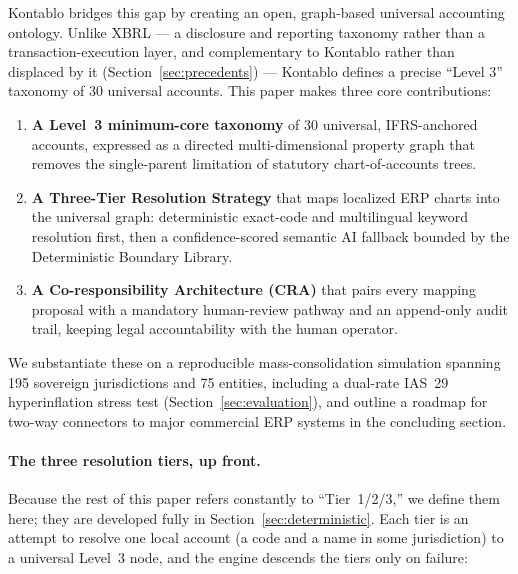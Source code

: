 Kontablo bridges this gap by creating an open, graph-based universal accounting ontology. Unlike XBRL --- a disclosure and reporting taxonomy rather than a transaction-execution layer, and complementary to Kontablo rather than displaced by it (Section~\ref{sec:precedents}) --- Kontablo defines a precise ``Level 3'' taxonomy of 30 universal accounts. This paper makes three core contributions:
\begin{enumerate}
    \item \textbf{A Level~3 minimum-core taxonomy} of 30 universal, IFRS-anchored accounts, expressed as a directed multi-dimensional property graph that removes the single-parent limitation of statutory chart-of-accounts trees.
    \item \textbf{A Three-Tier Resolution Strategy} that maps localized ERP charts into the universal graph: deterministic exact-code and multilingual keyword resolution first, then a confidence-scored semantic AI fallback bounded by the Deterministic Boundary Library.
    \item \textbf{A Co-responsibility Architecture (CRA)} that pairs every mapping proposal with a mandatory human-review pathway and an append-only audit trail, keeping legal accountability with the human operator.
\end{enumerate}
We substantiate these on a reproducible mass-consolidation simulation spanning 195 sovereign jurisdictions and 75 entities, including a dual-rate IAS~29 hyperinflation stress test (Section~\ref{sec:evaluation}), and outline a roadmap for two-way connectors to major commercial ERP systems in the concluding section.

\paragraph{The three resolution tiers, up front.} Because the rest of this
paper refers constantly to ``Tier~1/2/3,'' we define them here; they are
developed fully in Section~\ref{sec:deterministic}. Each tier is an attempt to
resolve one local account (a code and a name in some jurisdiction) to a
universal Level~3 node, and the engine descends the tiers only on failure:

